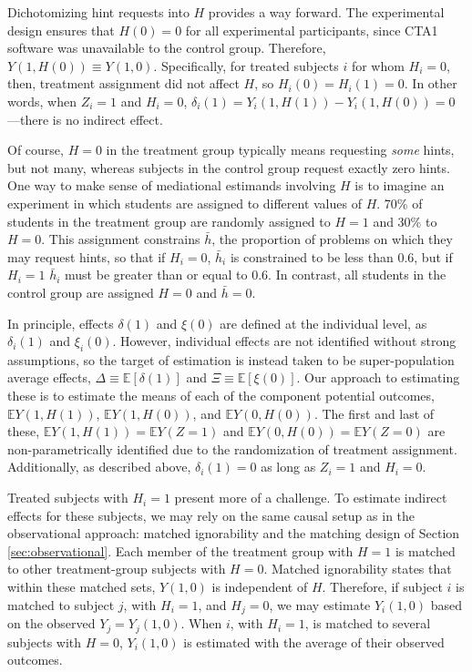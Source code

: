 \documentclass{article}\usepackage[]{graphicx}\usepackage[]{color}
\newcommand{\EE}{\mathbb{E}}
\begin{document}
Dichotomizing hint requests into $H$ provides a
way forward.
The experimental design ensures that $H(0)=0$ for all experimental
participants, since
CTA1 software was unavailable to the control group.
Therefore, $Y(1,H(0))\equiv Y(1,0)$.
Specifically, for treated subjects $i$ for whom $H_i=0$, then, treatment assignment
did not affect $H$, so $H_i(0)=H_i(1)=0$.
In other words, when $Z_i=1$ and $H_i=0$,
$\delta_i(1)=Y_i(1,H(1))-Y_i(1,H(0))=0$---there is no
indirect effect.

Of course, $H=0$ in the treatment group typically means requesting
\emph{some} hints, but not many, whereas subjects in the control group
request exactly zero hints.
One way to make sense of mediational estimands involving $H$ is to
imagine an experiment in which students are assigned to different
values of $H$.
70\% of students in the treatment group
are randomly assigned to $H=1$ and 30\% to
$H=0$.
This assignment constrains $\bar{h}$, the proportion of problems on which they
may request hints, so that if $H_i=0$,
$\bar{h}_i$ is constrained to be less than
0.6,
but if $H_i=1$ $\bar{h}_i$ must be greater than or equal to
0.6.
In contrast, all students in the control group are assigned $H=0$ and $\bar{h}=0$.

In principle, effects $\delta(1)$ and $\xi(0)$ are defined at the
individual level, as $\delta_i(1)$ and $\xi_i(0)$.
However, individual effects are
not identified without strong assumptions, so the target of
estimation is instead taken to be super-population average effects,
$\Delta\equiv\EE[\delta(1)]$ and $\Xi\equiv\EE[\xi(0)]$.
Our approach to estimating these
is to estimate the means of each of the component potential outcomes,
$\EE Y(1,H(1))$, $\EE Y(1,H(0))$, and $\EE Y(0,H(0))$.
The first and last of these, $\EE Y(1,H(1))=\EE Y(Z=1)$ and $\EE
Y(0,H(0))=\EE Y(Z=0)$ are non-parametrically identified due to the
randomization of treatment assignment.
Additionally, as described above, $\delta_i(1)=0$ as long as $Z_i=1$ and $H_i=0$.

Treated subjects with $H_i=1$ present more of a challenge.
To estimate indirect effects for these subjects, we may rely on the
same causal setup as in the observational approach:
matched ignorability and the matching design of Section
\ref{sec:observational}.
Each member of the treatment group with $H=1$ is matched to other
treatment-group subjects with $H=0$.
Matched ignorability states that within these matched sets, $Y(1,0)$
is independent of $H$.
Therefore, if subject $i$ is matched to subject $j$, with $H_i=1$, and
$H_j=0$, we may estimate $Y_i(1,0)$ based on the observed
$Y_j=Y_j(1,0)$.
When $i$, with $H_i=1$, is matched to several subjects with $H=0$,
$Y_i(1,0)$ is estimated with the average of their observed outcomes.
\end{document}
